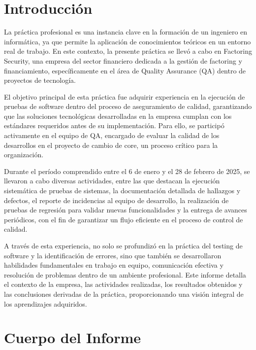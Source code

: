 \documentclass[12pt,a4paper]{report}
\begin{document}
\chapter{Introducción}
La práctica profesional es una instancia clave en la formación de un ingeniero en informática, ya que permite la aplicación de conocimientos teóricos en un entorno real de trabajo. En este contexto, la presente práctica se llevó a cabo en Factoring Security, una empresa del sector financiero dedicada a la gestión de factoring y financiamiento, específicamente en el área de Quality Assurance (QA) dentro de proyectos de tecnología.

El objetivo principal de esta práctica fue adquirir experiencia en la ejecución de pruebas de software dentro del proceso de aseguramiento de calidad, garantizando que las soluciones tecnológicas desarrolladas en la empresa cumplan con los estándares requeridos antes de su implementación. Para ello, se participó activamente en el equipo de QA, encargado de evaluar la calidad de los desarrollos en el proyecto de cambio de core, un proceso crítico para la organización.

Durante el período comprendido entre el 6 de enero y el 28 de febrero de 2025, se llevaron a cabo diversas actividades, entre las que destacan la ejecución sistemática de pruebas de sistemas, la documentación detallada de hallazgos y defectos, el reporte de incidencias al equipo de desarrollo, la realización de pruebas de regresión para validar nuevas funcionalidades y la entrega de avances periódicos, con el fin de garantizar un flujo eficiente en el proceso de control de calidad.

A través de esta experiencia, no solo se profundizó en la práctica del testing de software y la identificación de errores, sino que también se desarrollaron habilidades fundamentales en trabajo en equipo, comunicación efectiva y resolución de problemas dentro de un ambiente profesional. Este informe detalla el contexto de la empresa, las actividades realizadas, los resultados obtenidos y las conclusiones derivadas de la práctica, proporcionando una visión integral de los aprendizajes adquiridos.

\chapter{Cuerpo del Informe}

\end{document}
